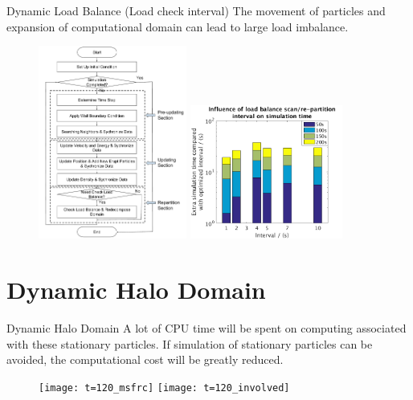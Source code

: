 \documentclass{beamer}
\begin{document}
\begin{frame}{Dynamic Load Balance (Load check interval)}
The movement of particles and expansion of computational domain can lead to large load imbalance. 
\begin{figure}
\flushleft
\includegraphics[width=0.435\textwidth]{../Work_flow}
\hfill
\includegraphics[width=0.445\textwidth]{../int_bar}
\end{figure}
\end{frame}

\section{Dynamic Halo Domain}
\begin{frame}{Dynamic Halo Domain}
A lot of CPU time will be spent
on computing associated with these stationary particles. If simulation of stationary particles can be avoided, the computational cost will be greatly reduced. 
\begin{figure}
\flushleft
\texttt{[image: t=120\_msfrc]}
\hfill
\texttt{[image: t=120\_involved]}
\end{figure}
\end{frame}
\end{document}
